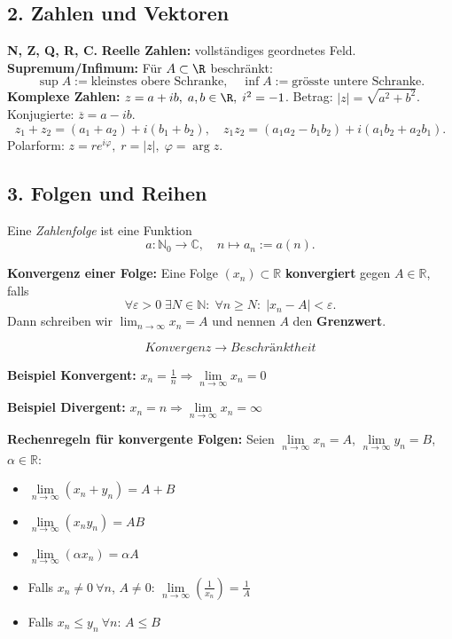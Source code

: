 \subsection{2. Zahlen und Vektoren}
\textbf{N, Z, Q, R, C.}  
\textbf{Reelle Zahlen:} vollständiges geordnetes Feld.  
\textbf{Supremum/Infimum:} Für $A\subset\R$ beschränkt:  
\[
\sup A:=\text{kleinstes obere Schranke},\quad
\inf A:=\text{grösste untere Schranke}.
\]
\textbf{Komplexe Zahlen:} $z=a+ib,\;a,b\in\R,\;i^2=-1$.  
Betrag: $|z|=\sqrt{a^2+b^2}$.  
Konjugierte: $\overline z=a-ib$.  
\[
z_1+z_2=(a_1+a_2)+i(b_1+b_2),\quad
z_1z_2=(a_1a_2-b_1b_2)+i(a_1b_2+a_2b_1).
\]
Polarform: $z=r e^{i\varphi},\;r=|z|,\;\varphi=\arg z$.

\subsection{3. Folgen und Reihen}  
Eine \emph{ Zahlenfolge} ist eine Funktion  
\[
a : \mathbb{N}_0 \to \mathbb{C}, \quad n \mapsto a_n := a(n).
\]  

\textbf{Konvergenz einer Folge:}  
Eine Folge \( (x_n) \subset \mathbb{R} \) \textbf{konvergiert} gegen \( A \in \mathbb{R} \), falls  
\[
\forall \varepsilon > 0\; \exists N \in \mathbb{N}:\; \forall n \geq N:\; |x_n - A| < \varepsilon.
\]  
Dann schreiben wir \( \lim_{n \to \infty} x_n = A \) und nennen \( A \) den \textbf{Grenzwert}.

\[
Konvergenz \to Beschränktheit
\]  

\textbf{Beispiel Konvergent:} \( x_n = \frac{1}{n} \Rightarrow \lim\limits_{n \to \infty} x_n = 0 \)

\textbf{Beispiel Divergent:} \( x_n = n \Rightarrow \lim\limits_{n \to \infty} x_n = \infty \)

\textbf{Rechenregeln für konvergente Folgen:}  
Seien \( \lim\limits_{n \to \infty} x_n = A \), \( \lim\limits_{n \to \infty} y_n = B \), \( \alpha \in \mathbb{R} \):

\begin{itemize}
  \item \( \lim\limits_{n \to \infty} (x_n + y_n) = A + B \)
  \item \( \lim\limits_{n \to \infty} (x_n y_n) = AB \)
  \item \( \lim\limits_{n \to \infty} (\alpha x_n) = \alpha A \)
  \item Falls \( x_n \neq 0\ \forall n \), \( A \neq 0 \):  
        \( \lim\limits_{n \to \infty} \left( \frac{1}{x_n} \right) = \frac{1}{A} \)
  \item Falls \( x_n \leq y_n\ \forall n \): \( A \leq B \)
\end{itemize}

